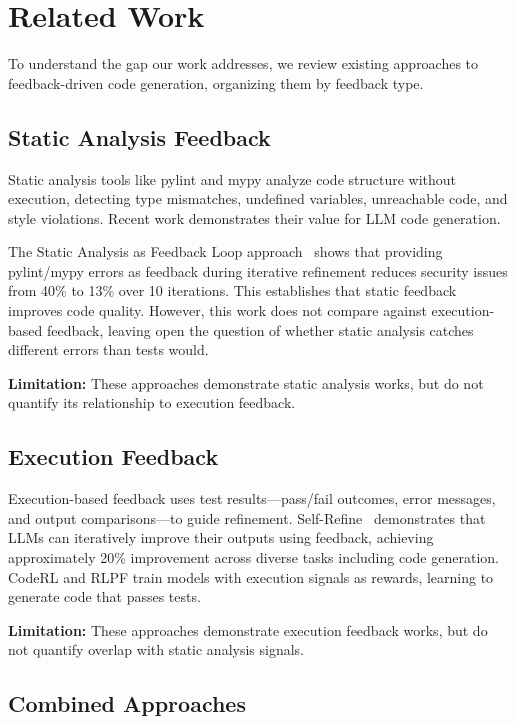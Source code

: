 \section{Related Work}
\label{sec:related}

To understand the gap our work addresses, we review existing approaches to feedback-driven code generation, organizing them by feedback type.

\subsection{Static Analysis Feedback}

Static analysis tools like pylint and mypy analyze code structure without execution, detecting type mismatches, undefined variables, unreachable code, and style violations. Recent work demonstrates their value for LLM code generation.

The Static Analysis as Feedback Loop approach~\cite{staticfeedback2025} shows that providing pylint/mypy errors as feedback during iterative refinement reduces security issues from 40\% to 13\% over 10 iterations. This establishes that static feedback improves code quality. However, this work does not compare against execution-based feedback, leaving open the question of whether static analysis catches different errors than tests would.

\textbf{Limitation:} These approaches demonstrate static analysis works, but do not quantify its relationship to execution feedback.

\subsection{Execution Feedback}

Execution-based feedback uses test results---pass/fail outcomes, error messages, and output comparisons---to guide refinement. Self-Refine~\cite{madaan2023selfrefine} demonstrates that LLMs can iteratively improve their outputs using feedback, achieving approximately 20\% improvement across diverse tasks including code generation. CodeRL and RLPF train models with execution signals as rewards, learning to generate code that passes tests.

\textbf{Limitation:} These approaches demonstrate execution feedback works, but do not quantify overlap with static analysis signals.

\subsection{Combined Approaches}

